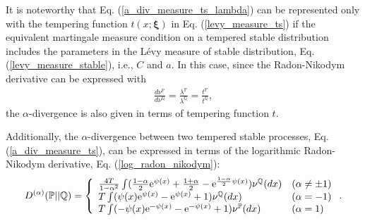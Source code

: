 \documentclass[preprint,11pt]{amsart}
\begin{document}
	It is noteworthy that Eq. (\ref{a_div_measure_ts_lambda}) can be represented only with the tempering function $t(x;\boldsymbol{\xi})$ in Eq. (\ref{levy_measure_ts}) if the equivalent martingale measure condition on a tempered stable distribution includes the parameters in the L\'evy measure of stable distribution, Eq. (\ref{levy_measure_stable}), i.e., $C$ and $a$. In this case, since the Radon-Nikodym derivative can be expressed with
	\begin{align}
		\frac{d\nu^\mathbb{P}}{d\nu^\mathbb{Q}}=\frac{\lambda^\mathbb{P}}{\lambda^\mathbb{Q}}=\frac{t^\mathbb{P}}{t^\mathbb{Q}},\nonumber
	\end{align}
	the $\alpha$-divergence is also given in terms of tempering function $t$.
			
	Additionally, the $\alpha$-divergence between two tempered stable processes, Eq. (\ref{a_div_measure_ts}), can be expressed in terms of the logarithmic Radon-Nikodym derivative, Eq. (\ref{log_radon_nikodym}):
	\begin{align}
	\label{a_div_measure_ts_psi}
	D^{(\alpha )}(\mathbb{P}||\mathbb{Q})=\left\{ 
	\begin{array}{ll}
	\frac{4T}{1-\alpha ^{2}}\int(\frac{1-\alpha}{2}{\rm e}^{\psi(x)} +\frac{1+\alpha}{2}-{\rm e}^{\frac{1-\alpha}{2}\psi(x)})\nu^\mathbb{Q}(dx) & (\alpha \neq \pm 1)\\ 
	T\int (\psi(x){\rm e}^{\psi(x)}-{\rm e}^{\psi(x)}+1)\nu^\mathbb{Q}(dx) & (\alpha =-1)\\
	T\int (-\psi(x){\rm e}^{-\psi(x)}-{\rm e}^{-\psi(x)}+1)\nu^\mathbb{P}(dx) & (\alpha =1)
	\end{array}
	\right..
	\end{align}
	
\end{document}
